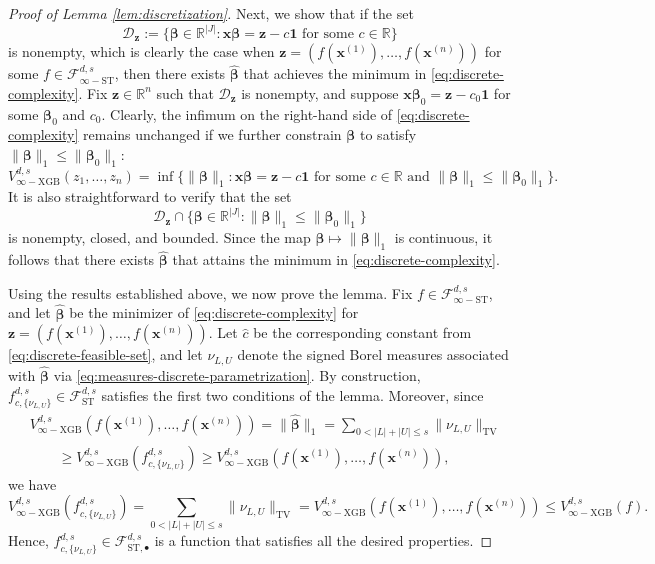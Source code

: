 \documentclass[10pt]{article}
\newcommand{\R}{{\mathbb R}}
\newcommand{\fst}{{\mathcal{F}^{d, s}_{\text{ST}}}}
\newcommand{\fstmid}{{\mathcal{F}^{d, s}_{\text{ST}, \bullet}}}
\newcommand{\fstinf}{{\mathcal{F}^{d, s}_{\infty-\text{ST}}}}
\newcommand{\vinfxgb}{{V^{d, s}_{\infty-\text{XGB}}}}
\newcommand{\fcnu}{{f^{d, s}_{c, \{\nu_{L, U}\}}}}
\newcommand{\xbf}{{\mathbf{x}}}
\newcommand{\zbf}{{\mathbf{z}}}
\newcommand{\betabf}{{\boldsymbol{\beta}}}
\newcommand{\onevec}{{\mathbf{1}}}
\begin{document}
\begin{proof}[Proof of Lemma \ref{lem:discretization}]
Next, we show that if the set 
\begin{equation}\label{eq:discrete-feasible-set}
    \mathcal{D}_{\zbf} := \big\{\betabf \in \R^{|J|}: 
    \xbf \betabf = \zbf - c \onevec 
    \text{ for some } c \in \R\big\}
\end{equation}
is nonempty, which is clearly the case when
$\zbf = (f(\xbf^{(1)}), \dots, f(\xbf^{(n)}))$ 
for some $f \in \fstinf$, then there exists $\hat{\betabf}$ that achieves 
the minimum in \eqref{eq:discrete-complexity}.
Fix $\zbf \in \R^n$ such that $\mathcal{D}_{\zbf}$ is 
nonempty, and suppose $\xbf \betabf_0 = \zbf - c_0 \onevec$ 
for some $\betabf_0$ and $c_0$.
Clearly, the infimum on the right-hand side of 
\eqref{eq:discrete-complexity} remains unchanged if we further 
constrain $\betabf$ to satisfy $\|\betabf\|_1 \le \|\betabf_0\|_1$:
\begin{equation*}
    \vinfxgb(z_1, \dots, z_n) = \inf \big\{\|\betabf\|_1: \xbf \betabf 
    = \zbf - c \onevec \text{ for some } c \in \R 
    \text{ and } \|\betabf\|_1 \le \|\betabf_0\|_1\big\}.
\end{equation*}
It is also straightforward to verify that the set
\begin{equation*}
    \mathcal{D}_{\zbf} \cap \{\betabf \in \R^{|J|}: 
    \|\betabf\|_1 \le \|\betabf_0\|_1\}
\end{equation*}
is nonempty, closed, and bounded.
Since the map $\betabf \mapsto \|\betabf\|_1$ is continuous, it follows 
that there exists $\hat{\betabf}$ that attains the minimum in
\eqref{eq:discrete-complexity}.

Using the results established above, we now prove the lemma. 
Fix $f \in \fstinf$, and let $\hat{\betabf}$ be the minimizer of 
\eqref{eq:discrete-complexity} for $\zbf = (f(\xbf^{(1)}), \dots, 
f(\xbf^{(n)}))$.
Let $\hat{c}$ be the corresponding constant from 
\eqref{eq:discrete-feasible-set}, and let 
$\nu_{L, U}$ denote the signed Borel measures associated with 
$\hat{\betabf}$ via \eqref{eq:measures-discrete-parametrization}.
By construction, $\fcnu \in \fst$ 
satisfies the first two conditions of the lemma. 
Moreover, since
\begin{equation*}
\begin{aligned}
    &\vinfxgb(f(\xbf^{(1)}), \dots, f(\xbf^{(n)})) 
    = \|\hat{\betabf}\|_1 
    = \sum_{0 < |L| + |U| \le s} \|\nu_{L, U}\|_{\text{TV}} \\
    &\qquad \ge \vinfxgb(\fcnu)
    \ge \vinfxgb(f(\xbf^{(1)}), \dots, f(\xbf^{(n)})),
\end{aligned}
\end{equation*} 
we have
\begin{equation*}
    \vinfxgb(\fcnu) 
    = \sum_{0 < |L| + |U| \le s} \|\nu_{L, U}\|_{\text{TV}}
    = \vinfxgb(f(\xbf^{(1)}), \dots, f(\xbf^{(n)})) 
    \le \vinfxgb(f).
\end{equation*}
Hence, $\fcnu \in \fstmid$ is a function that satisfies 
all the desired properties.
\end{proof}
\end{document}
